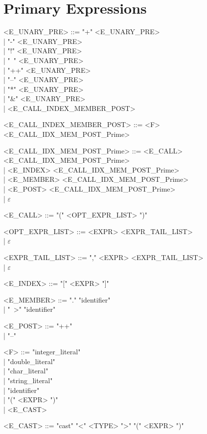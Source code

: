 \section{Primary Expressions}
\begin{grammar}
<E\_UNARY\_PRE> ::= "+" <E\_UNARY\_PRE> \\
                  | "-" <E\_UNARY\_PRE> \\
                  | "!" <E\_UNARY\_PRE> \\
                  | "~" <E\_UNARY\_PRE> \\
                  | "++" <E\_UNARY\_PRE> \\
                  | "--" <E\_UNARY\_PRE> \\
                  | "*" <E\_UNARY\_PRE> \\
                  | "&" <E\_UNARY\_PRE> \\
                  | <E\_CALL\_INDEX\_MEMBER\_POST>

<E\_CALL\_INDEX\_MEMBER\_POST> ::= <F> <E\_CALL\_IDX\_MEM\_POST\_Prime>

<E\_CALL\_IDX\_MEM\_POST\_Prime> ::= <E\_CALL> <E\_CALL\_IDX\_MEM\_POST\_Prime> \\
                                  | <E\_INDEX> <E\_CALL\_IDX\_MEM\_POST\_Prime> \\
                                  | <E\_MEMBER> <E\_CALL\_IDX\_MEM\_POST\_Prime> \\
                                  | <E\_POST> <E\_CALL\_IDX\_MEM\_POST\_Prime> \\
                                  | $\varepsilon$

<E\_CALL> ::= "(" <OPT\_EXPR\_LIST> ")"

<OPT\_EXPR\_LIST> ::= <EXPR> <EXPR\_TAIL\_LIST> \\
                    | $\varepsilon$

<EXPR\_TAIL\_LIST> ::= "," <EXPR> <EXPR\_TAIL\_LIST> \\
                     | $\varepsilon$

<E\_INDEX> ::= "[" <EXPR> "]"

<E\_MEMBER> ::= "." "identifier" \\
              | "~>" "identifier"

<E\_POST> ::= "++" \\
            | "--"

<F> ::= "integer_literal" \\
      | "double_literal" \\
      | "char_literal" \\
      | "string_literal" \\
      | "identifier" \\
      | "(" <EXPR> ")" \\
      | <E\_CAST>

<E\_CAST> ::= "cast" "<" <TYPE> ">" "(" <EXPR> ")"
\end{grammar}